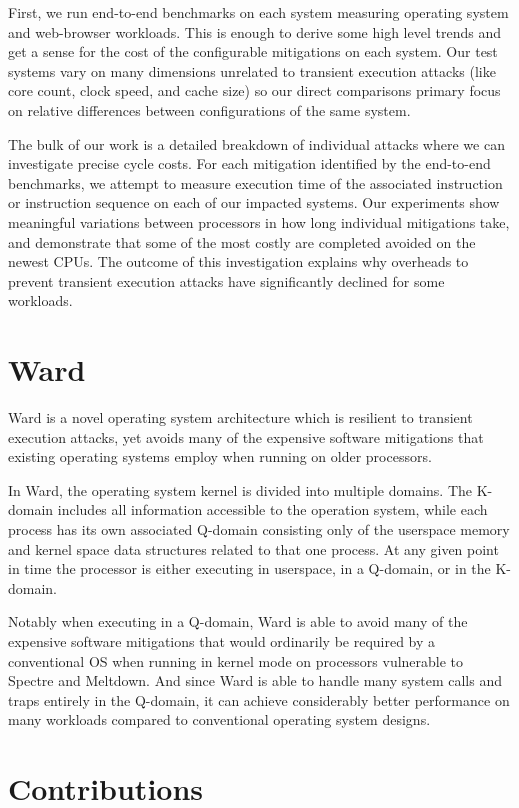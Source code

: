 First, we run end-to-end benchmarks on each system measuring operating system and web-browser workloads.
This is enough to derive some high level trends and get a sense for the cost of the configurable mitigations on each system.
Our test systems vary on many dimensions unrelated to transient execution attacks (like core count, clock speed, and cache size) so our direct comparisons primary focus on relative differences between configurations of the same system.

The bulk of our work is a detailed breakdown of individual attacks where we can investigate precise cycle costs.
For each mitigation identified by the end-to-end benchmarks, we attempt to measure execution time of the associated instruction or instruction sequence on each of our impacted systems.
Our experiments show meaningful variations between processors in how long individual mitigations take, and demonstrate that some of the most costly are completed avoided on the newest CPUs. 
The outcome of this investigation explains why overheads to prevent transient execution attacks have significantly declined for some workloads.

\section{Ward}
Ward is a novel operating system architecture which is resilient to transient execution attacks, yet avoids many of the expensive software mitigations that existing operating systems employ when running on older processors. 

In Ward, the operating system kernel is divided into multiple domains.
The K-domain includes all information accessible to the operation system, while each process has its own associated Q-domain consisting only of the userspace memory and kernel space data structures related to that one process.
At any given point in time the processor is either executing in userspace, in a Q-domain, or in the K-domain. 

Notably when executing in a Q-domain, Ward is able to avoid many of the expensive software mitigations that would ordinarily be required by a conventional OS when running in kernel mode on processors vulnerable to Spectre and Meltdown.
And since Ward is able to handle many system calls and traps entirely in the Q-domain, it can achieve considerably better performance on many workloads compared to conventional operating system designs.

\section{Contributions}

